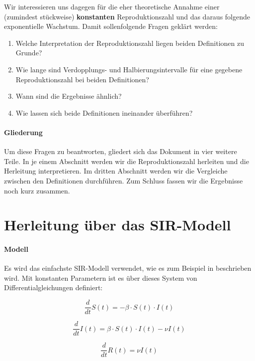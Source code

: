 \documentclass[a4paper]{article}
\begin{document}
    Wir interessieren uns dagegen für die eher theoretische Annahme einer (zumindest stückweise) \textbf{konstanten} Reproduktionszahl und das daraus folgende exponentielle Wachstum. Damit sollenfolgende Fragen geklärt werden:

    \begin{enumerate}
        \item Welche Interpretation der Reproduktionszahl liegen beiden Definitionen zu Grunde?
        \item Wie lange sind Verdopplungs- und Halbierungsintervalle für eine gegebene Reproduktionszahl bei beiden Definitionen?
        \item Wann sind die Ergebnisse ähnlich?
        \item Wie lassen sich beide Definitionen ineinander überführen?
    \end{enumerate}

    \paragraph{Gliederung}Um diese Fragen zu beantworten, gliedert sich das Dokument in vier weitere Teile. In je einem Abschnitt werden wir die Reproduktionszahl herleiten und die Herleitung interpretieren. Im dritten Abschnitt werden wir die Vergleiche zwischen den Definitionen durchführen. Zum Schluss fassen wir die Ergebnisse noch kurz zusammen.

    \section{Herleitung über das SIR-Modell}
    \paragraph{Modell}Es wird das einfachste SIR-Modell verwendet, wie es zum Beispiel in \cite{jonesOnR0} beschrieben wird. Mit konstanten Parametern ist es über dieses System von Differentialgleichungen definiert:

    \begin{equation}
        \frac{d}{dt} S(t) = - \beta \cdot S(t) \cdot I(t)
    \end{equation}

    \begin{equation}
        \frac{d}{dt} I(t) = \beta \cdot S(t) \cdot I(t) - \nu I(t)
    \end{equation}

    \begin{equation}
        \frac{d}{dt} R(t) = \nu I(t)
    \end{equation}
\end{document}
